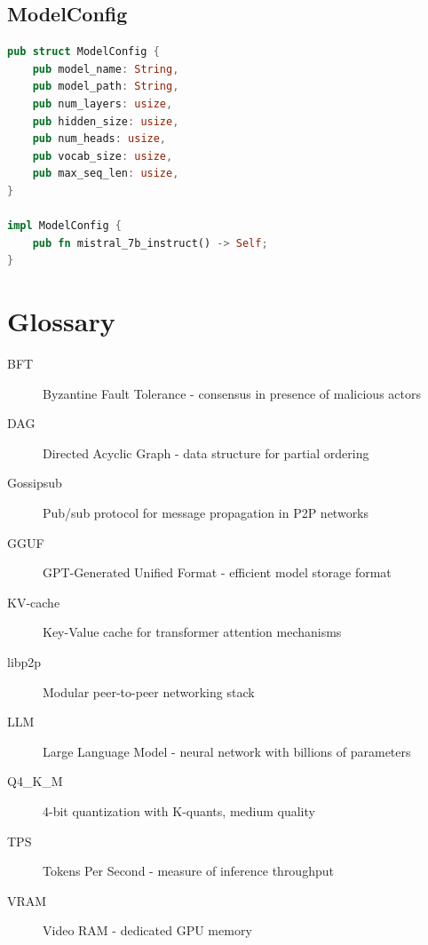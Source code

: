 \documentclass[12pt,a4paper]{article}
\begin{document}
\subsection{ModelConfig}
\begin{lstlisting}[language=Rust]
pub struct ModelConfig {
    pub model_name: String,
    pub model_path: String,
    pub num_layers: usize,
    pub hidden_size: usize,
    pub num_heads: usize,
    pub vocab_size: usize,
    pub max_seq_len: usize,
}

impl ModelConfig {
    pub fn mistral_7b_instruct() -> Self;
}
\end{lstlisting}

\section{Glossary}

\begin{description}
    \item[BFT] Byzantine Fault Tolerance - consensus in presence of malicious actors
    \item[DAG] Directed Acyclic Graph - data structure for partial ordering
    \item[Gossipsub] Pub/sub protocol for message propagation in P2P networks
    \item[GGUF] GPT-Generated Unified Format - efficient model storage format
    \item[KV-cache] Key-Value cache for transformer attention mechanisms
    \item[libp2p] Modular peer-to-peer networking stack
    \item[LLM] Large Language Model - neural network with billions of parameters
    \item[Q4\_K\_M] 4-bit quantization with K-quants, medium quality
    \item[TPS] Tokens Per Second - measure of inference throughput
    \item[VRAM] Video RAM - dedicated GPU memory
\end{description}
\end{document}
